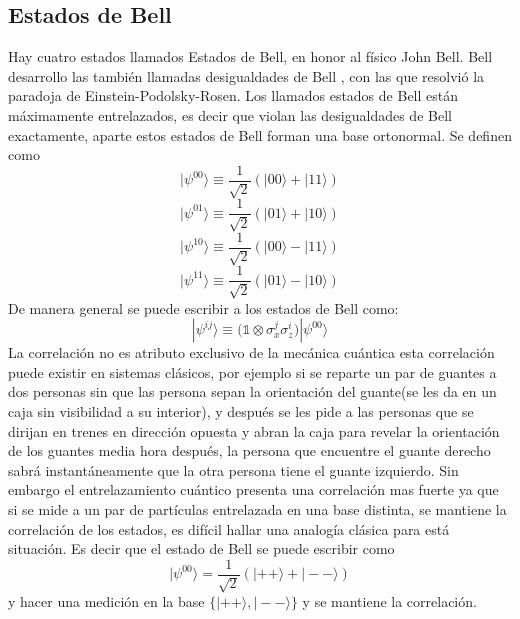 \documentclass[a4paper]{article}
\begin{document}
\subsection{Estados de Bell}
Hay cuatro estados llamados Estados de Bell, en honor al físico John Bell. Bell desarrollo las también llamadas desigualdades de Bell \cite{Bell}, con las que resolvió la paradoja de Einstein-Podolsky-Rosen. Los llamados estados de Bell están máximamente entrelazados, es decir que violan las desigualdades de Bell exactamente, aparte estos estados de Bell forman una base ortonormal. Se definen como
\begin{equation}\label{eq::bell1}
|\psi^{00}\rangle\equiv \frac{1}{\sqrt{2}}(|00\rangle+|11\rangle)
\end{equation}
\begin{equation}\label{eq::bell2}
|\psi^{01}\rangle\equiv \frac{1}{\sqrt{2}}(|01\rangle+|10\rangle)
\end{equation}
\begin{equation}\label{eq::bell3}
|\psi^{10}\rangle\equiv \frac{1}{\sqrt{2}}(|00\rangle-|11\rangle)
\end{equation}
\begin{equation}\label{eq::bell4}
|\psi^{11}\rangle\equiv \frac{1}{\sqrt{2}}(|01\rangle-|10\rangle)
\end{equation}
De manera general se puede escribir a los estados de Bell como:
\begin{equation}
|\psi^{ij}\rangle\equiv \big( \mathbb{1}\otimes\sigma_x^j \sigma_z^i \big)|\psi^{00}\rangle
\end{equation}
La correlación no es atributo exclusivo de la mecánica cuántica esta correlación puede existir en sistemas clásicos, por ejemplo si se reparte un par de guantes a dos personas sin que las persona sepan la orientación del guante(se les da en un caja sin visibilidad a su interior), y después se les pide a las personas que se dirijan en trenes en dirección opuesta y abran la caja para revelar la orientación de los guantes media hora después, la persona que encuentre el guante derecho sabrá instantáneamente que la otra persona tiene el guante izquierdo. Sin embargo el entrelazamiento cuántico presenta una correlación mas fuerte ya que si se mide a un par de partículas entrelazada en una base distinta, se mantiene la correlación de los estados, es difícil hallar una analogía clásica para está situación. Es decir que el estado de Bell se puede escribir como
\begin{equation}
|\psi^{00}\rangle=\frac{1}{\sqrt{2}}(|++\rangle+|--\rangle)
\end{equation}
y hacer una medición en la base $\{|++\rangle,|--\rangle\}$ y se mantiene la correlación.
\end{document}
